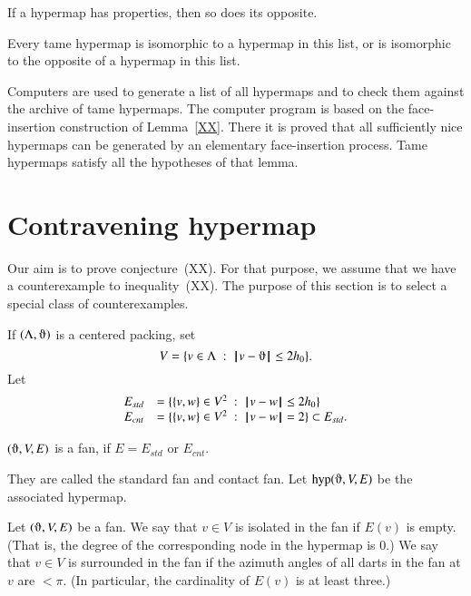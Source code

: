 \begin{lemma} If a hypermap has properties, 
then so does its opposite.
\end{lemma}

\begin{theorem}
\label{theorem:classification} Every tame hypermap is isomorphic to
a hypermap in this list, or is isomorphic to the opposite of a
hypermap in this list.
\end{theorem}


Computers are used to generate a list of all hypermaps and to check
them against the archive of tame hypermaps.  The computer program is
based on the face-insertion construction of Lemma~\ref{XX}.  There it is
proved that all sufficiently nice hypermaps can be generated by an
elementary face-insertion process.  Tame hypermaps satisfy all the
hypotheses of that lemma.

\section{Contravening hypermap}

Our aim is to prove conjecture~(XX).  For that purpose, we assume that
we have a counterexample to inequality~(XX).  The purpose of this section is to select a special class of counterexamples.

If $(\Lambda,\orgn)$ is a centered packing, set
$$
V = \{v\in \Lambda\mid \norm{v}{\orgn}\le 2\hm\}.
$$
Let
\begin{equation}\label{eqn:fan-edge}
\begin{array}{lll}
 E_{std} &= \{\{v,w\}\in V^2\ :\  {\hskip0.1em|\hskip-0.15em|\hskip0.1em}v - w{\hskip0.1em|\hskip-0.15em|\hskip0.1em}\le 2{h_0} \}\\
 E_{cnt} &= \{\{v,w\}\in V^2\ :\  {\hskip0.1em|\hskip-0.15em|\hskip0.1em}v - w{\hskip0.1em|\hskip-0.15em|\hskip0.1em}= 2 \}\subset E_{std}.
\end{array}
\end{equation}

\begin{lemma}
$(\orgn,V,E)$ is a fan, if $E=E_{std}$ or $E_{cnt}$.
\end{lemma}
They are called the standard fan and contact fan.
Let $\op{hyp}(\orgn,V,E)$ be the associated hypermap.

\begin{definition}
Let $(\orgn,V,E)$ be a fan.
We say that $v\in V$ is isolated in the fan if $E(v)$ is empty.
(That is, the degree of the corresponding node in the hypermap is $0$.) We say that $v\in V$ is surrounded in the fan if the azimuth angles of all darts in the fan at $v$ are $<\pi$.  (In particular, the cardinality of $E(v)$ is at least three.)
\end{definition}

